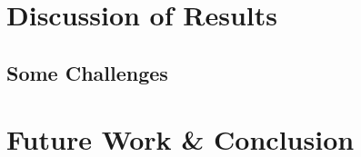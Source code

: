 \documentclass[11pt]{article}
\begin{document}
\section{Discussion of Results}

\subsection*{Some Challenges} %


\section{Future Work \& Conclusion}






\end{document}

